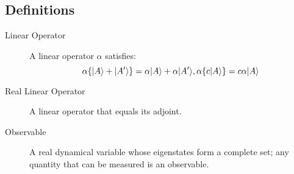 \subsection{Definitions}
\begin{definition}
\begin{description}
	\item[Linear Operator]
	A linear operator $\alpha$ satisfies:
	\begin{equation}
	\alpha \{| A \rangle+| A' \rangle\}  =  \alpha | A \rangle + \alpha | A' \rangle, \\
	\alpha \{ c | A \rangle\}  =  c \alpha | A \rangle
	\end{equation}
\end{description}
\end{definition}
\begin{definition}
\begin{description}
	\item[Real Linear Operator]
	A linear operator that equals its adjoint.
\end{description}
\end{definition}
\begin{definition}
\begin{description}
	\item[Observable]
	A real dynamical variable whose eigenstates form a complete set; any quantity that can be measured is an observable.
\end{description}
\end{definition}

